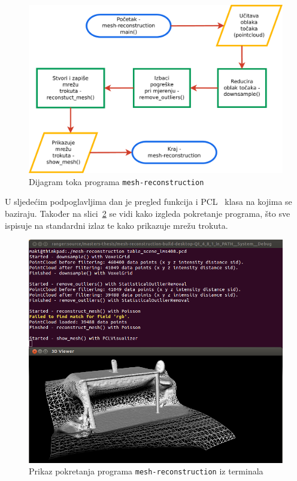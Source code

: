 
\setcounter{figure}{1}
\begin{figure}[h]
\renewcommand{\figurename}{Grafikon}
\centering
\includegraphics[scale=0.5]{figures/flowchart.pdf}
\caption{Dijagram toka programa \texttt{mesh-reconstruction} }
\label{fig:flowchart}
\end{figure}

U sljedećim podpoglavljima dan je pregled funkcija i PCL~\cite{1184}
klasa na kojima se baziraju. Također na
slici~\ref{fig:running-mesh-reconstruction} se vidi kako izgleda
pokretanje programa, što sve ispisuje na standardni izlaz te kako
prikazuje mrežu trokuta.

\newpage
\setcounter{figure}{1}
\begin{figure}[h]
\centering
\includegraphics[scale=0.5]{figures/running-mesh-reconstruction.png}
\caption{Prikaz pokretanja programa \texttt{mesh-reconstruction} iz
terminala}
\label{fig:running-mesh-reconstruction}
\end{figure}

